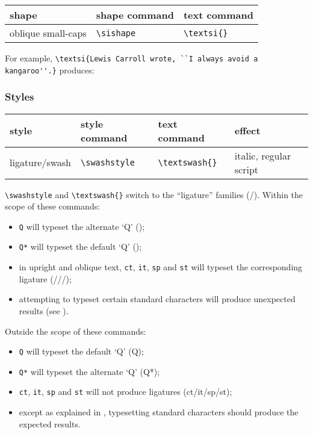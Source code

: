 \documentclass[11pt,british]{article}
\begin{document}
	\begin{longtable}{lll}
		\toprule
		\textbf{shape}			&	\textbf{shape command}	&	\textbf{text command}\\\midrule\endhead
		\bottomrule\endfoot
		oblique small-caps		&	\verb|\sishape|					&	\verb|\textsi{}|\\
	\end{longtable}
		
	For example, \verb|\textsi{Lewis Carroll wrote, ``I always avoid a kangaroo''.}| produces:
		\begin{center}
		\end{center}		
	
\subsubsection{Styles}

	\begin{longtable}{llll}
		\toprule
		\textbf{style}			&	\textbf{style command}	&	\textbf{text command}	&	\textbf{effect}\\\midrule\endhead
		\bottomrule\endfoot
		ligature/swash			&	\verb|\swashstyle|				&	\verb|\textswash{}|			&	italic, regular script\\
	\end{longtable}
	
	\verb|\swashstyle| and \verb|\textswash{}| switch to the ``ligature'' families (/). Within the scope of these commands:
	\begin{itemize}
		\item \verb|Q| will typeset the alternate `Q' ();
		\item \verb|Q*| will typeset the default `Q' ();
		\item in upright and oblique text, \verb|ct|, \verb|it|, \verb|sp| and \verb|st|  will typeset the corresponding ligature (///);
		\item attempting to typeset certain standard characters will produce unexpected results (see ).
	\end{itemize}
	
	Outside the scope of these commands:
	\begin{itemize}
		\item \verb|Q| will typeset the default `Q' (Q);
		\item \verb|Q*| will typeset the alternate `Q' (Q*);
		\item \verb|ct|, \verb|it|, \verb|sp| and \verb|st|  will not produce ligatures (ct/it/sp/st);
		\item except as explained in , typesetting standard characters should produce the expected results.
	\end{itemize}	
	
\end{document}
